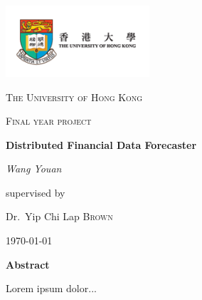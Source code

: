 \documentclass[12pt,a4paper]{report}
\begin{document}
\begin{titlepage}
	\centering
	\includegraphics[width=0.4\textwidth]{hku-logo.png}\par\vspace{1cm}
	{\scshape\LARGE The University of Hong Kong \par}
	\vspace{1cm}
	{\scshape\Large Final year project\par}
	\vspace{1.5cm}
	{\huge\bfseries Distributed Financial Data Forecaster\par}
	\vspace{2cm}
	{\Large\itshape Wang Youan\par}
	\vfill
	supervised by\par
	Dr.~Yip Chi Lap \textsc{Brown}

	\vfill

	{\large \today\par}
\end{titlepage}
\thispagestyle{plain}
{\Huge\textbf{Abstract}\par}
Lorem ipsum dolor...
\end{document}
